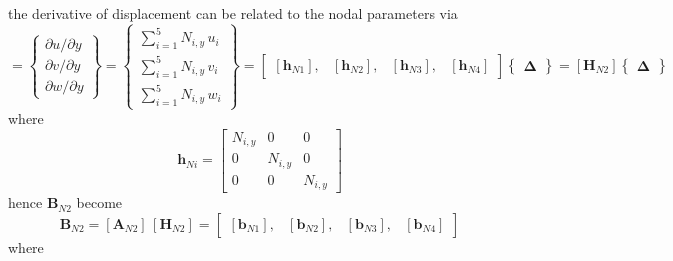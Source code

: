 the derivative of displacement can be related to the nodal parameters via
\begin{equation}
[\boldsymbol{\theta}_{N2}] =  \begin{Bmatrix}
\partial u / \partial y\\
\partial v / \partial y \\
\partial w / \partial y
\end{Bmatrix}
= \begin{Bmatrix}
\sum\nolimits_{i=1}^5 N_{i,y} \, u_i\\
\sum\nolimits_{i=1}^5 N_{i,y} \, v_i \\
\sum\nolimits_{i=1}^5 N_{i,y} \, w_i
\end{Bmatrix} 
= \begin{bmatrix}
[\mathbf{h}_{N1}], & [\mathbf{h}_{N2}], & [\mathbf{h}_{N3}], & [\mathbf{h}_{N4}] 
\end{bmatrix}  \begin{Bmatrix} \boldsymbol{\Delta} \end{Bmatrix}  
= [\mathbf{H}_{N2}] \begin{Bmatrix} \boldsymbol{\Delta} \end{Bmatrix} 
\end{equation}
where 
\begin{equation}
\mathbf{h}_{Ni} = \begin{bmatrix}
N_{i,y} &  0 & 0  \\
0 & N_{i,y} & 0  \\
0 & 0 & N_{i,y} \end{bmatrix} 
\end{equation}
hence $\mathbf{B}_{N2}$ become
\begin{equation}
\mathbf{B}_{N2} = [\mathbf{A}_{N2}] \, [\mathbf{H}_{N2}] = \begin{bmatrix}
[\mathbf{b}_{N1}], & [\mathbf{b}_{N2}], & [\mathbf{b}_{N3}], & [\mathbf{b}_{N4}]
\end{bmatrix} 
\end{equation}
where
